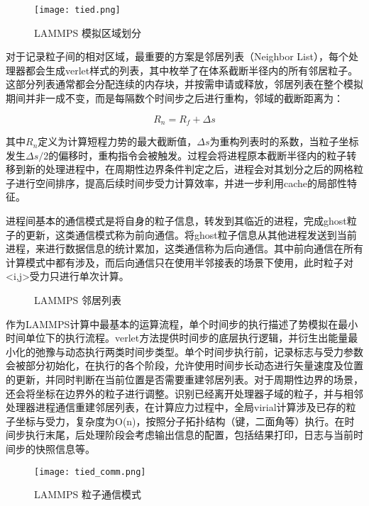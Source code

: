  \begin{figure}[h]
  \centering
  \texttt{[image: tied.png]}
  \caption{LAMMPS 模拟区域划分}
\end{figure}

  对于记录粒子间的相对区域，最重要的方案是邻居列表（Neighbor List），每个处理器都会生成verlet样式的列表，其中枚举了在体系截断半径内的所有邻居粒子。这部分列表通常都会分配连续的内存块，并按需申请或释放，邻居列表在整个模拟期间并非一成不变，而是每隔数个时间步之后进行重构，邻域的截断距离为：
  
\begin{equation}
R_n = R_f + \Delta s
\end{equation}

其中$R_n$定义为计算短程力势的最大截断值，$\Delta s$为重构列表时的系数，当粒子坐标发生$\Delta s/2$的偏移时，重构指令会被触发。过程会将进程原本截断半径内的粒子转移到新的处理进程中，在周期性边界条件判定之后，进程会对其划分之后的网格粒子进行空间排序，提高后续时间步受力计算效率，并进一步利用cache的局部性特征。

进程间基本的通信模式是将自身的粒子信息，转发到其临近的进程，完成ghost粒子的更新，这类通信模式称为前向通信。将ghost粒子信息从其他进程发送到当前进程，来进行数据信息的统计累加，这类通信称为后向通信。其中前向通信在所有计算模式中都有涉及，而后向通信只在使用半邻接表的场景下使用，此时粒子对<i,j>受力只进行单次计算。

 \begin{figure}[h]
  \centering
  \hspace{0.5in}
  \caption{LAMMPS 邻居列表}
\end{figure}

 作为LAMMPS计算中最基本的运算流程，单个时间步的执行描述了势模拟在最小时间单位下的执行流程。verlet方法提供时间步的底层执行逻辑，并衍生出能量最小化的弛豫与动态执行两类时间步类型。单个时间步执行前，记录标志与受力参数会被部分初始化，在执行的各个阶段，允许使用时间步长动态进行矢量速度及位置的更新，并同时判断在当前位置是否需要重建邻居列表。对于周期性边界的场景，还会将坐标在边界外的粒子进行调整。识别已经离开处理器子域的粒子，并与相邻处理器进程通信重建邻居列表，在计算应力过程中，全局virial计算涉及已存的粒子坐标与受力，复杂度为O(n)，按照分子拓扑结构（键，二面角等）执行。在时间步执行末尾，后处理阶段会考虑输出信息的配置，包括结果打印，日志与当前时间步的快照信息等。

  \begin{figure}[h]
  \centering
  \texttt{[image: tied\_comm.png]}
  \caption{LAMMPS 粒子通信模式}
\end{figure}

